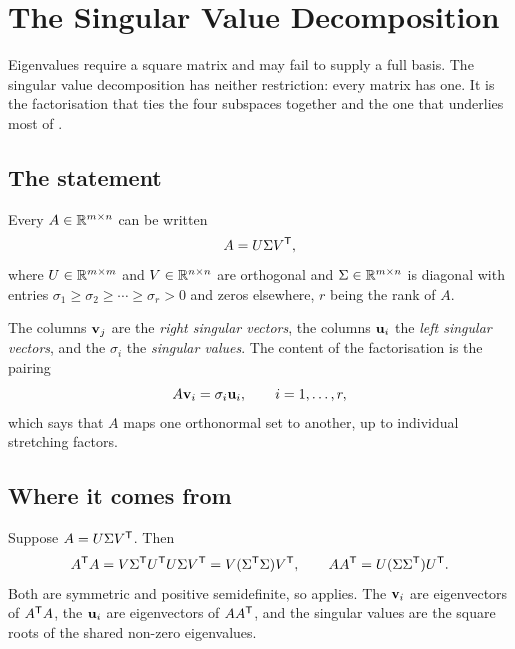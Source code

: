 \setchapterpreamble[u]{\margintoc}
\chapter{The Singular Value Decomposition}


Eigenvalues require a square matrix and may fail to supply a full basis. The
singular value decomposition has neither restriction: every matrix has one. It
is the factorisation that ties the four subspaces together and the one that
underlies most of .

\section{The statement}

\begin{theorem}
Every \(A\in\mathbb{R}^{m\times n}\) can be written
\[
	A=U\Sigma V^{\mathsf{T}},
\]
where \(U\in\mathbb{R}^{m\times m}\) and \(V\in\mathbb{R}^{n\times n}\) are orthogonal and
\(\Sigma\in\mathbb{R}^{m\times n}\) is diagonal with entries
\(\sigma_1\ge\sigma_2\ge\cdots\ge\sigma_r>0\) and zeros elsewhere, \(r\) being
the rank of \(A\).
\end{theorem}

The columns \(\mathbf{v}_j\) are the \emph{right singular vectors}, the columns
\(\mathbf{u}_i\) the \emph{left singular vectors}, and the \(\sigma_i\) the
\emph{singular values}. The content of the factorisation is the pairing
\[
	A\mathbf{v}_i=\sigma_i\mathbf{u}_i,
	\qquad i=1,\ldots,r,
\]
which says that \(A\) maps one orthonormal set to another, up to individual
stretching factors.


\section{Where it comes from}

Suppose \(A=U\Sigma V^{\mathsf{T}}\). Then
\[
	A^{\mathsf{T}} A=V\Sigma^{\mathsf{T}} U^{\mathsf{T}} U\Sigma V^{\mathsf{T}}=V(\Sigma^{\mathsf{T}}\Sigma)V^{\mathsf{T}},
	\qquad
	AA^{\mathsf{T}}=U(\Sigma\Sigma^{\mathsf{T}})U^{\mathsf{T}} .
\]
Both are symmetric and positive semidefinite, so  applies. The
\(\mathbf{v}_i\) are eigenvectors of \(A^{\mathsf{T}} A\), the \(\mathbf{u}_i\) are
eigenvectors of \(AA^{\mathsf{T}}\), and the singular values are the square roots of the
shared non-zero eigenvalues.

